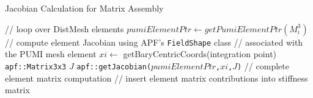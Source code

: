 \begin{algorithm}
  \caption{Jacobian Calculation for Matrix Assembly}
  \label{alg:omega3pJacobian}
  \begin{algorithmic}[1]
    \State // loop over DistMesh elements
      \State $pumiElementPtr \gets getPumiElementPtr(M^3_i)$
             \label{alg:o3p_pointer}
        \State // compute element Jacobian using
                  APF's \texttt{FieldShape} class
        \State // associated with the PUMI mesh element
        \State $xi \leftarrow$ getBaryCentricCoords(integration point)
               \label{alg:o3p_bary}
        \State \texttt{apf::Matrix3x3} $J$
        \State \texttt{apf::getJacobian($pumiElementPtr$,$xi$,$J$)}
               \label{alg:o3p_getJ}
        \State // complete element matrix computation
      \EndFor
      \State // insert element matrix contributions into stiffness matrix
    \EndFor
  \end{algorithmic}
\end{algorithm}

